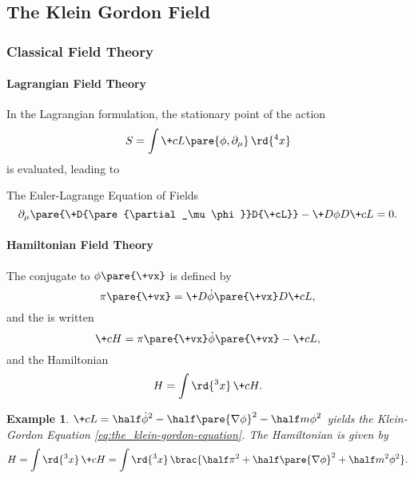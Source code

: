 \documentclass[hidelinks]{article}
\newtheorem{example}{Example}
\let\grad\nabla
\begin{document}

\subsection{The Klein Gordon Field} %
\label{sub:the_klein_gordon_field}

\subsubsection{Classical Field Theory} %
\label{ssub:classical_field_theory}

\paragraph{Lagrangian Field Theory} %
\label{par:lagrangian_field_theory}

In the Lagrangian formulation, the stationary point of the action
\[ S = \int \+cL\pare{\phi,\partial_\mu}\,\rd{^4x} \]
is evaluated, leading to
\begin{finaleq}{The Euler-Lagrange Equation of Fields}
    \[ \partial_\mu\pare{\+D{\pare{\partial_\mu \phi}}D{\+cL}} - \+D\phi D{\+cL} = 0. \]
\end{finaleq}


\paragraph{Hamiltonian Field Theory} %
\label{par:hamiltonian_field_theory}

The  conjugate to $\phi\pare{\+vx}$ is defined by
\[ \pi\pare{\+vx} = \+D{\dot{\phi}\pare{\+vx}}D{\+cL}, \]
and the  is written
\[ \+cH = \pi\pare{\+vx} \dot{\phi}\pare{\+vx} - \+cL, \]
and the Hamiltonian
\[ H = \int \rd{^3x}\, \+cH. \]
\begin{sample}
    \begin{example}
        $\displaystyle \+cL = \half \dot{\phi}^2 - \half \pare{\grad\phi}^2 - \half m\phi^2$ yields the Klein-Gordon Equation \eqref{eq:the_klein-gordon-equation}. The Hamiltonian is given by
        \begin{equation}
            \label{eq:hamiltonian_of_the_klein_gordon_field}
            H = \int \rd{^3 x}\, \+cH = \int \rd{^3 x}\,\brac{\half \pi^2 + \half \pare{\grad \phi}^2 + \half m^2\phi^2}.
        \end{equation}
    \end{example}
\end{sample}
\end{document}
